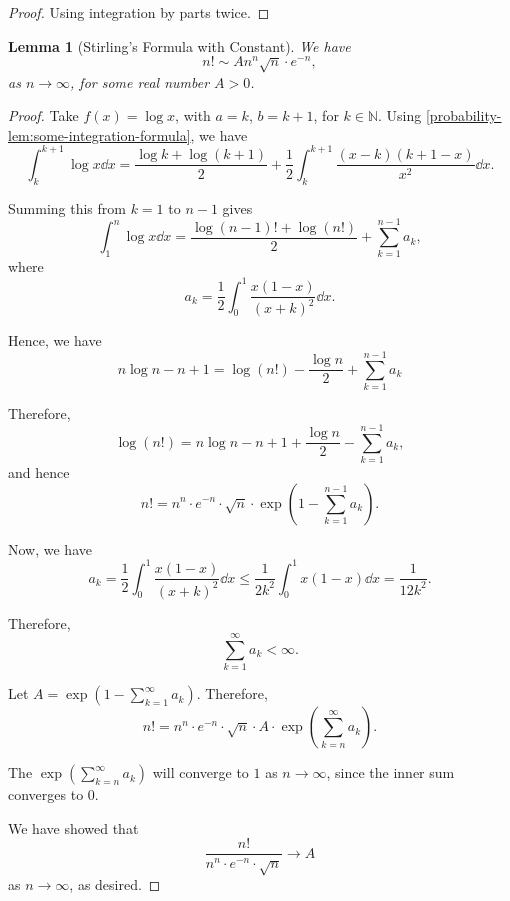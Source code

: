 \documentclass[11pt]{article}
\numberwithin{equation}{section}
\newtheorem{lemma}[theorem]{Lemma}
\theoremstyle{definition}
\theoremstyle{remark}
\newcommand{\pqty}[1]{\left(#1\right)}
\newcommand{\NN}{\mathbb N}
\begin{document}
\begin{proof}\label{probability-proof-002}
    Using integration by parts twice.
\end{proof}


\begin{lemma}[Stirling's Formula with Constant]\label{probability-lemma-002}
    \label{probability-lem:stirling-formula-constant}%
    We have
    \[
        n! \sim A n^n \sqrt{n} \cdot e^{-n},
    \]
    as \(n \to \infty\), for some real number \(A > 0\).
\end{lemma}

\begin{proof}\label{probability-proof-003}
    Take \(f\pqty{x} = \log x\), with \(a = k\), \(b = k + 1\), for \(k \in \NN\). Using \autoref{probability-lem:some-integration-formula}, we have
    \[
        \int_{k}^{k + 1} \log x \dd{x} = \frac{\log k + \log\pqty{k + 1}}{2} + \frac{1}{2} \int_{k}^{k + 1} \frac{\pqty{x - k} \pqty{k + 1 - x}}{x^2} \dd{x}.
    \]

    Summing this from \(k = 1\) to \(n - 1\) gives
    \[
        \int_{1}^{n} \log x \dd{x} = \frac{\log \pqty{n - 1}! + \log \pqty{n!}}{2} + \sum_{k = 1}^{n - 1} a_k,
    \]
    where
    \[
        a_k = \frac{1}{2} \int_{0}^{1} \frac{x \pqty{1 - x}}{\pqty{x + k}^2} \dd{x}.
    \]

    Hence, we have
    \[
        n \log n - n + 1 = \log\pqty{n!} - \frac{\log n}{2} + \sum_{k = 1}^{n - 1} a_k
    \]

    Therefore,
    \[
        \log \pqty{n!} = n \log n - n + 1 + \frac{\log n}{2} - \sum_{k = 1}^{n - 1} a_k,
    \]
    and hence
    \[
        n! = n^n \cdot e^{-n} \cdot \sqrt{n} \cdot \exp\pqty{1 - \sum_{k = 1}^{n - 1} a_k}.
    \]

    Now, we have
    \[
        a_k = \frac{1}{2} \int_{0}^{1} \frac{x \pqty{1 - x}}{\pqty{x + k}^2} \dd{x} \leq \frac{1}{2k^2} \int_{0}^{1} x\pqty{1 - x} \dd{x} = \frac{1}{12k^2}.
    \]

    Therefore,
    \[
        \sum_{k = 1}^{\infty} a_k < \infty.
    \]

    Let \(A = \exp\pqty{1 - \sum_{k = 1}^{\infty} a_k}\). Therefore,
    \[
        n! = n^n \cdot e^{-n} \cdot \sqrt{n} \cdot A \cdot \exp\pqty{\sum_{k = n}^{\infty} a_k}.
    \]

    The \(\exp\pqty{\sum_{k = n}^{\infty} a_k}\) will converge to \(1\) as \(n \to \infty\), since the inner sum converges to \(0\).

    We have showed that
    \[
        \frac{n!}{n^n \cdot e^{-n} \cdot \sqrt{n}} \to A
    \]
    as \(n \to \infty\), as desired.
\end{proof}
\end{document}
